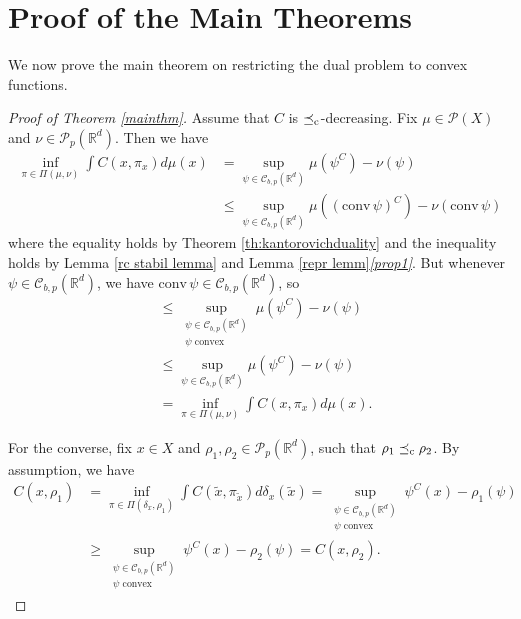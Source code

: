 \documentclass[reqno, a4paper]{amsart}
\newcommand{\lc}{\preceq_{\textnormal{c}}}
\newcommand{\conv}{\mathrm{conv}\,}
\newcommand{\PP}{\mathcal{P}}
\newcommand{\R}{\mathbb R}
\theoremstyle{definition}
\theoremstyle{definition}
\theoremstyle{definition}
\begin{document}


\section{Proof of the Main Theorems}\label{MT}


We now prove the main theorem on restricting the dual problem to convex functions.






\begin{proof}[Proof of Theorem \ref{mainthm}]
    Assume that $C$ is $\lc$-decreasing. Fix $\mu\in\PP(X)$ and $\nu\in\PP_p(\R^d)$. Then we have
    \begin{align*}
		\inf_{\pi\in\Pi(\mu,\nu)} \int C(x,\pi_x)d\mu(x)&= \sup_{\psi \in {\mathcal{C}}^{}_{b,p}(\R^d)} \mu(\psi^C) - \nu(\psi)\\
        &\leq \sup_{\psi \in {\mathcal{C}}^{}_{b,p}(\R^d)} \mu( (\conv\psi)^C) - \nu(\conv\psi)
	\end{align*}
    where the equality holds by Theorem \ref{th:kantorovichduality} and the inequality holds by Lemma \ref{rc stabil lemma} and Lemma \ref{repr lemm}\textit{\ref{prop1}}. 
But whenever $\psi\in{\mathcal{C}}_{b,p}(\R^d)$, we have $\conv \psi \in {\mathcal{C}}_{b,p}(\R^d)$, so
    \begin{align*}
        &\leq \sup_{\substack{\psi \in {\mathcal{C}}^{}_{b,p}(\R^d) \\ \psi \text{ convex}}} \mu( \psi^C) - \nu(\psi)\\
        &\leq \sup_{\psi \in {\mathcal{C}}^{}_{b,p}(\R^d)} \mu(\psi^C) - \nu(\psi)\\&=\inf_{\pi\in\Pi(\mu,\nu)} \int C(x,\pi_x)d\mu(x).
	\end{align*}

    For the converse, fix $x\in X$ and $\rho_1,\rho_2\in\PP_p(\R^d)$, such that $\rho_1\lc\rho_2$. By assumption, we have
    \begin{align*} 
       C(x,\rho_1)&=\inf_{\pi\in\Pi(\delta_x,\rho_1)}\int C(\widetilde x,\pi_{\widetilde{x}}) d\delta_x(\widetilde{x})= \sup_{\substack{\psi \in  {\mathcal{C}}^{}_{b,p}(\R^d) \\\psi \text{ convex}}} \psi^C(x) - \rho_1(\psi)\\
       &\geq \sup_{\substack{\psi \in  {\mathcal{C}}^{}_{b,p}(\R^d) \\ \psi\text{ convex}}} \psi^C(x) - \rho_2(\psi)=C(x,\rho_2).
    \end{align*}
\end{proof}
\end{document}
